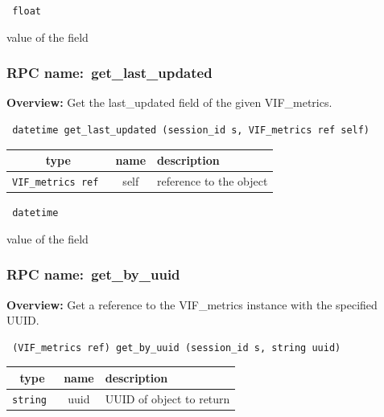 \vspace{0.3cm}

{\tt 
float
}


value of the field
\vspace{0.3cm}
\vspace{0.3cm}
\vspace{0.3cm}
\subsubsection{RPC name:~get\_last\_updated}

{\bf Overview:} 
Get the last\_updated field of the given VIF\_metrics.

\begin{verbatim} datetime get_last_updated (session_id s, VIF_metrics ref self)\end{verbatim}



 
\vspace{0.3cm}
\begin{tabular}{|c|c|p{7cm}|}
 \hline
{\bf type} & {\bf name} & {\bf description} \\ \hline
{\tt VIF\_metrics ref } & self & reference to the object \\ \hline 

\end{tabular}

\vspace{0.3cm}

{\tt 
datetime
}


value of the field
\vspace{0.3cm}
\vspace{0.3cm}
\vspace{0.3cm}
\subsubsection{RPC name:~get\_by\_uuid}

{\bf Overview:} 
Get a reference to the VIF\_metrics instance with the specified UUID.

\begin{verbatim} (VIF_metrics ref) get_by_uuid (session_id s, string uuid)\end{verbatim}



 
\vspace{0.3cm}
\begin{tabular}{|c|c|p{7cm}|}
 \hline
{\bf type} & {\bf name} & {\bf description} \\ \hline
{\tt string } & uuid & UUID of object to return \\ \hline 

\end{tabular}


